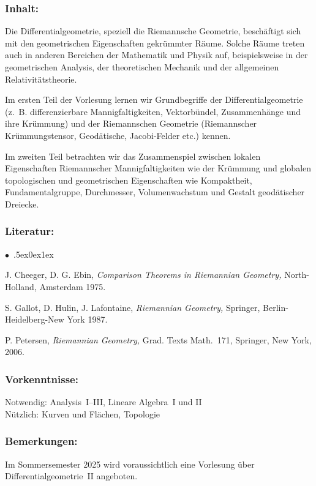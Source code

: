 \documentclass[a4paper,10pt]{article}
\renewenvironment{itemize}{\begin{list}{$\bullet$\ }{\itemsep.5ex\setlength{\topsep}{0.5\itemsep}\parsep0ex\labelsep1ex\settowidth{\labelwidth}{$\bullet$\ }\setlength{\leftmargin}{\labelwidth}\addtolength{\leftmargin}{3ex}\addtolength{\leftmargin}{\labelsep}}}{\end{list}}
\begin{document}
\subsubsection*{\large
    Inhalt:
}
Die Differentialgeometrie, speziell die Riemannsche Geometrie, besch\"aftigt sich mit den geometrischen Eigenschaften gekr\"ummter R\"aume.
Solche R\"aume treten auch in anderen Bereichen der Mathematik und Physik auf, beispielsweise in der geometrischen Analysis, der theoretischen Mechanik
und der allgemeinen Relativit\"atstheorie.

Im ersten Teil der Vorlesung lernen wir Grundbegriffe der Differentialgeometrie (z.\ B. differenzierbare Mannigfaltigkeiten, Vektorb\"undel, Zusammenh\"ange und ihre Kr\"ummung) und der Riemannschen Geometrie (Riemannscher Kr\"ummungstensor, Geod\"atische, Jacobi-Felder etc.) kennen.

Im zweiten Teil betrachten wir das Zusammenspiel zwischen lokalen Eigenschaften Riemannscher Mannigfaltigkeiten wie der Kr\"ummung und globalen topologischen und geometrischen Eigenschaften wie Kompaktheit, Fundamentalgruppe, Durchmesser, Volumenwachstum und Gestalt geod\"atischer Dreiecke.
\subsubsection*{\large
    Literatur:
}
\begin{itemize}
\item{J. Cheeger, D. G. Ebin, {\em Comparison Theorems in Riemannian Geometry,\/} North-Holland, Amsterdam 1975.}
\item{S. Gallot, D. Hulin, J. Lafontaine, {\em Riemannian Geometry,\/} Springer, Berlin-Heidelberg-New York 1987.}
\item{P. Petersen, {\em Riemannian Geometry,\/} Grad. Texts Math.~171, Springer, New York, 2006.}
\end{itemize}
\subsubsection*{\large
    Vorkenntnisse:
}
Notwendig: Analysis~I–III, Lineare Algebra~I und II \\
Nützlich: Kurven und Flächen, Topologie
\subsubsection*{\large
    Bemerkungen:
}
Im Sommersemester 2025 wird voraussichtlich eine Vorlesung über Differentialgeometrie~II angeboten. 
\cleardoublepage
\end{document}
